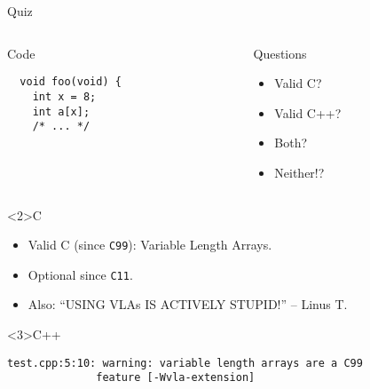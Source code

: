 \documentclass[presentation,aspectratio=169]{beamer}
\begin{document}
\begin{frame}[fragile,label={sec:org23c4234}]{Quiz}
\begin{columns}
\begin{column}{0.48\columnwidth}
\begin{block}{Code}
\begin{verbatim}
  void foo(void) {
    int x = 8;
    int a[x];
    /* ... */
\end{verbatim}
\end{block}
\end{column}

\begin{column}{0.48\columnwidth}
\begin{block}{Questions}
\begin{itemize}
\item Valid C?
\item Valid C++?
\item Both?
\item Neither!?
\end{itemize}
\end{block}
\end{column}
\end{columns}

\begin{block}<2>{C}
\begin{itemize}
\item Valid C (since \texttt{C99}): Variable Length Arrays.
\item Optional since \texttt{C11}.
\item Also: ``USING VLAs IS ACTIVELY STUPID!'' -- Linus T.
\end{itemize}
\end{block}

\vspace{-2cm}
\begin{block}<3>{C++}
\begin{verbatim}
test.cpp:5:10: warning: variable length arrays are a C99
              feature [-Wvla-extension]
\end{verbatim}
\end{block}
\end{frame}

\end{document}
